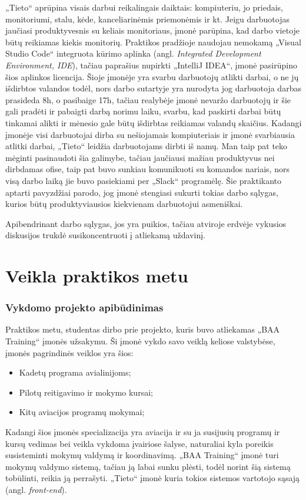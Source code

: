 \documentclass{VUMIFPSbakalaurinis}
\begin{document}
„Tieto“ aprūpina visais darbui reikalingais daiktais: kompiuteriu, jo priedais, monitoriumi, stalu, kėde, kanceliarinėmis priemonėmis ir kt. Jeigu darbuotojas jaučiasi produktyvesnis su keliais monitoriaus, įmonė parūpina, kad darbo vietoje būtų reikiamas kiekis monitorių. Praktikos pradžioje naudojau nemokamą „Visual Studio Code“ integruota kūrimo aplinka (angl. \textit{Integrated Development Environment, IDE}), tačiau paprašius nupirkti „IntelliJ IDEA“, įmonė pasirūpino šios aplinkos licencija. Šioje įmonėje yra svarbu darbuotojų atlikti darbai, o ne jų išdirbtos valandos todėl, nors darbo sutartyje yra nurodyta jog darbuotoja darbas prasideda 8h, o pasibaige 17h, tačiau realybėje įmonė nevaržo darbuotojų ir šie gali pradėti ir pabaigti darbą norimu laiku, svarbu, kad paskirti darbai būtų tinkamai alikti ir mėnesio gale būtų išdirbtas reikiamas valandų skaičius. Kadangi įmonėje visi darbuotojai dirba su nešiojamais kompiuteriais ir įmonė svarbiausia atlitki darbai, „Tieto“ leidžia darbuotojams dirbti iš namų. Man taip pat teko mėginti pasinaudoti šia galimybe, tačiau jaučiausi mažiau produktyvus nei dirbdamas ofise, taip pat buvo sunkiau komunikuoti su komandos nariais, nors visą darbo laiką jie buvo pasiekiami per „Slack“ programėlę. Šie praktikanto aptarti pavyzdžiai parodo, jog įmonė stengiasi sukurti tokias darbo sąlygas, kurios būtų produktyviausios kiekvienam darbuotojui asmeniškai. 

Apibendrinant darbo sąlygas, jos yra puikios, tačiau atviroje erdvėje vykusios diskusijos trukdė susikoncentruoti į atliekamą uždavinį.
\section{Veikla praktikos metu}

\subsubsection{Vykdomo projekto apibūdinimas}
Praktikos metu, studentas dirbo prie projekto, kuris buvo atliekamas „BAA Training“ įmonės užsakymu. Ši įmonė vykdo savo veiklą keliose valstybėse, įmonės pagrindinės veiklos yra šios:
\begin{itemize}
    \item Kadetų programa avialinijoms;
    \item Pilotų reitigavimo ir mokymo kursai;
    \item Kitų aviacijos programų mokymai;
\end{itemize}
Kadangi šios įmonės specializacija yra aviacija ir su ja susijusių programų ir kursų vedimas bei veikla vykdoma įvairiose šalyse, naturaliai kyla poreikis susisteminti mokymų valdymą ir koordinavimą. „BAA Training“ įmonė turi mokymų valdymo sistemą, tačiau ją labai sunku plėsti, todėl norint šią sistemą tobūlinti, reikia ją perrašyti.  „Tieto“ įmonė kuria tokios sistemos vartotojo sąsają (angl. \textit{front-end}). 
\end{document}
